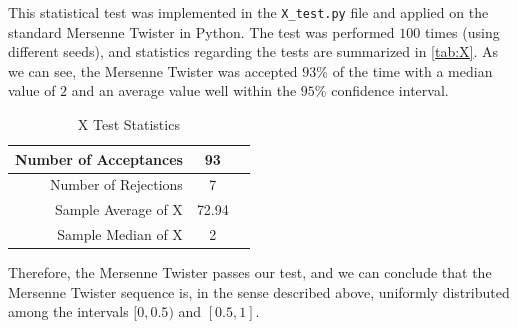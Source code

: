 \documentclass{article}
\begin{document}
\begin{enumerate}
        This statistical test was implemented in the \texttt{X\_test.py} file and applied on the standard Mersenne Twister in Python.
        The test was performed $100$ times (using different seeds), and statistics regarding the tests are summarized in \autoref{tab:X}.
        As we can see, the Mersenne Twister was accepted $93\%$ of the time with a median value of $2$ and an average value well within the $95\%$ confidence interval.

        \begin{table}[H]
            \centering
            \caption{X Test Statistics}
            \begin{tabular}{|r|c|c|} \hline
                \multicolumn{1}{|r|}{Number of Acceptances} & \multicolumn{1}{|c|}{93}   \\ \hline
                \multicolumn{1}{|r|}{Number of Rejections}  & \multicolumn{1}{|c|}{7}    \\ \hline
                \multicolumn{1}{|r|}{Sample Average of X}   & \multicolumn{1}{|c|}{72.94}   \\ \hline
                \multicolumn{1}{|r|}{Sample Median of X}   & \multicolumn{1}{|c|}{2}   \\ \hline
            \end{tabular}
            \label{tab:X}
        \end{table}

        Therefore, the Mersenne Twister passes our test, and we can conclude that the Mersenne Twister sequence is,
        in the sense described above, uniformly distributed among the intervals $[0, 0.5)$ and $[0.5, 1]$.
\end{enumerate}
\end{document}
